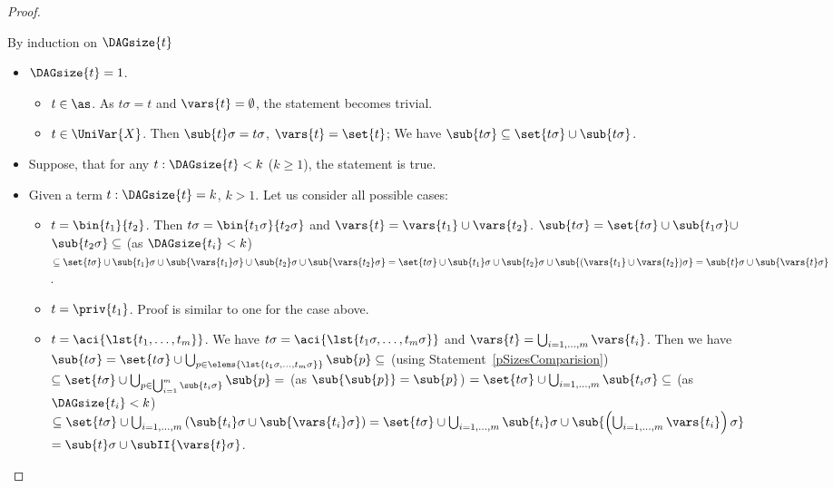 \begin{lemma}
{\begin{proof}
\begin{description}
\begin{itemize}
      \end{itemize}      
  \item [Statement~\ref{pSepVar}:]
      By induction on $$
      \begin{itemize}
	\item  $=1$. 
	      \begin{itemize}
	      \item $t\in\as$. As $t\sigma = t$ and $ = \emptyset$, the statement becomes trivial.
	      \item $t\in {}$. Then $\sigma = t\sigma$, $ = $; 
		    We have $ \subseteq {}\cup{}$.
	      \end{itemize}
	\item Suppose, that for any $t:  < k$ ($k$), the statement is true.
	\item Given a term  $t: =k$, $k>1$. Let us consider all possible cases:
	      \begin{itemize}
		\item $t=$. Then 
		      $t\sigma =  $ and $ = \cup{}$.
		      $ =  \cup {} \cup $ \br $  \subseteq $ (as $ < k$)
		      $\subseteq {} \cup {}\sigma\cup{} \cup {}\sigma\cup{}
		      =  \cup {}\sigma  \cup {}\sigma \cup {}
		      = \sigma \cup {}$.
		\item $t=$. Proof is similar to one for the case above.
		\item $t=$. We have $t\sigma =  $ and $ = \bigcup_{i=1,\dots,m}$.
		      Then we have $ =  \cup \bigcup_{p\in{}} \subseteq $ (using Statement~\ref{pSizesComparision})
		      $\subseteq {} \cup \bigcup_{p\in\bigcup_{i=1}^m} = $
		      (as $=$)
		      $=  \cup \bigcup_{i=1,\dots,m} \subseteq $
		      (as $ < k$) \\
		      $\subseteq  {} \cup \bigcup_{i=1,\dots,m}\left(\sigma\cup{} \right )
		      =  \cup \bigcup_{i=1,\dots,m}\sigma  \cup {}  $ \br $ 
		      = \sigma \cup {}$. 
	      \end{itemize}
      \end{itemize}
 \end{description}
\end{proof}
} \end{lemma}

